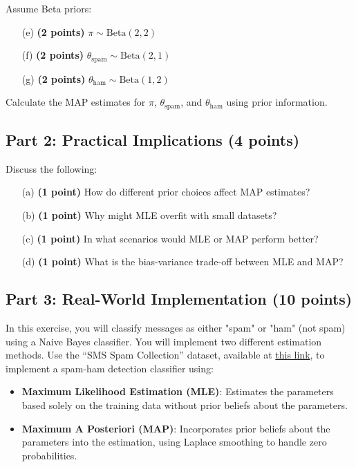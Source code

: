 \documentclass{article}
\begin{document}
\noindent Assume Beta priors:
\begin{itemize}
    \item[(e)] \textbf{(2 points)} $\pi \sim \text{Beta}(2, 2)$
    \item[(f)] \textbf{(2 points)} $\theta_{\text{spam}} \sim \text{Beta}(2, 1)$
    \item[(g)] \textbf{(2 points)} $\theta_{\text{ham}} \sim \text{Beta}(1, 2)$
\end{itemize}

\noindent Calculate the MAP estimates for $\pi$, $\theta_{\text{spam}}$, and $\theta_{\text{ham}}$ using prior information. 

\subsection*{Part 2: Practical Implications (4 points)}
Discuss the following:
\begin{enumerate}
    \item[(a)] \textbf{(1 point)} How do different prior choices affect MAP estimates?
    \item[(b)] \textbf{(1 point)} Why might MLE overfit with small datasets?
    \item[(c)] \textbf{(1 point)} In what scenarios would MLE or MAP perform better?
    \item[(d)] \textbf{(1 point)} What is the bias-variance trade-off between MLE and MAP?
\end{enumerate}

\subsection*{Part 3: Real-World Implementation (10 points)}
In this exercise, you will classify messages as either "spam" or "ham" (not spam) using a Naive Bayes classifier. You will implement two different estimation methods. Use the ``SMS Spam Collection'' dataset, available at \href{https://archive.ics.uci.edu/ml/datasets/SMS+Spam+Collection}{this link}, to implement a spam-ham detection classifier using:

\begin{itemize}
    \item \textbf{Maximum Likelihood Estimation (MLE)}: Estimates the parameters based solely on the training data without prior beliefs about the parameters.
    \item \textbf{Maximum A Posteriori (MAP)}: Incorporates prior beliefs about the parameters into the estimation, using Laplace smoothing to handle zero probabilities.
\end{itemize}
\end{document}
